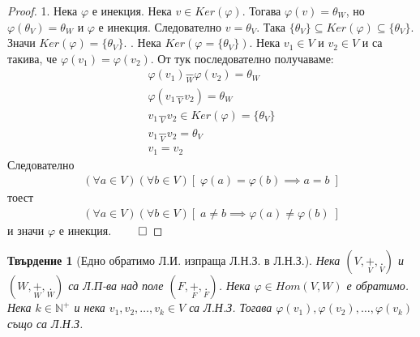 \documentclass[12pt]{article}
\newtheorem{proposition}{Твърдение}%
\begin{document}
\begin{proof}
1. Нека \(\varphi\) е инекция.
Нека \(v \in Ker(\varphi)\). Тогава \(\varphi(v) = \theta_W\),
но \(\varphi(\theta_V) = \theta_W\) и \(\varphi\) е инекция.
Следователно \(v = \theta_V\). Така \(\{\theta_V\} \subseteq Ker(\varphi) \subseteq \{\theta_V\}\).
Значи \(Ker(\varphi) = \{\theta_V\}\).
\newline
\vspace{2mm}
. Нека \(Ker(\varphi = \{\theta_V\})\).
Нека \(v_1 \in V\) и \(v_2 \in V\) и са такива, че
\(\varphi(v_1) = \varphi(v_2)\). От тук последователно получаваме:
\begin{align*}
\varphi(v_1) \underset{W}{-} \varphi(v_2) = \theta_W \\
\varphi(v_1 \underset{V}{-} v_2) = \theta_W \\
v_1 \underset{V}{-} v_2 \in Ker(\varphi) = \{\theta_V\} \\
v_1 \underset{V}{-} v_2 = \theta_V \\
v_1 = v_2
\end{align*}
Следователно
\begin{align*}
(\forall a \in V)(\forall b \in V)[\; \varphi(a) = \varphi(b) \implies a = b \;]
\end{align*}
тоест
\begin{align*}
(\forall a \in V)(\forall b \in V)[\; a \neq b \implies \varphi(a) \neq \varphi(b) \;]
\end{align*}
и значи \(\varphi\) е инекция. \(\qed\)
\end{proof}

\begin{proposition}[Едно обратимо Л.И. изпраща Л.Н.З. в Л.Н.З.]
Нека \((V, \underset{V}{+}, \underset{V}{.})\) и \((W, \underset{W}{+}, \underset{W}{.})\) са Л.П-ва над поле \((F, \underset{F}{+}, \underset{F}{.})\).
Нека \(\varphi \in Hom(V, W)\) е обратимо.
Нека \(k \in \mathbb{N}^+\) и нека \(v_1, v_2, \dots, v_k \in V\) са Л.Н.З.
Тогава \(\varphi(v_1), \varphi(v_2), \dots, \varphi(v_k)\) също са Л.Н.З. 
\end{proposition}
\end{document}

